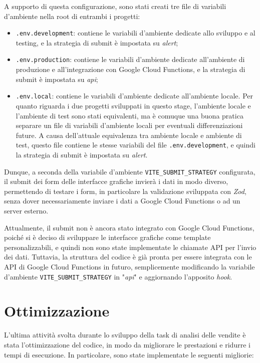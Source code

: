 A supporto di questa configurazione, sono stati creati tre file di variabili d'ambiente nella root di entrambi i progetti:
\begin{itemize}
    \item \texttt{.env.development}: contiene le variabili d'ambiente dedicate allo sviluppo e al testing, e la strategia di submit è impostata su \emph{alert};
    \item \texttt{.env.production}: contiene le variabili d'ambiente dedicate all'ambiente di produzione e all'integrazione con Google Cloud Functions, e la strategia di submit è impostata su \emph{api};
    \item \texttt{.env.local}: contiene le variabili d'ambiente dedicate all'ambiente locale. Per quanto riguarda i due progetti sviluppati in questo stage, l'ambiente locale e l'ambiente di test sono stati equivalenti, ma è comuque una buona pratica separare un file di variabili d'ambiente locali per eventuali differenziazioni future. A causa dell'attuale equivalenza tra ambiente locale e ambiente di test, questo file contiene le stesse variabili del file \texttt{.env.development}, e quindi la strategia di submit è impostata su \emph{alert}.
\end{itemize}

Dunque, a seconda della variabile d'ambiente \texttt{VITE\_SUBMIT\_STRATEGY} configurata, il submit dei form delle interfacce grafiche invierà i dati in modo diverso, permettendo di testare i form, in particolare la validazione sviluppata con \emph{Zod}, senza dover necessariamente inviare i dati a Google Cloud Functions o ad un server esterno.

Attualmente, il submit non è ancora stato integrato con Google Cloud Functions, poiché si è deciso di sviluppare le interfacce grafiche come template personalizzabili, e quindi non sono state implementate le chiamate API per l'invio dei dati. Tuttavia, la struttura del codice è già pronta per essere integrata con le API di Google Cloud Functions in futuro, semplicemente modificando la variabile d'ambiente \texttt{VITE\_SUBMIT\_STRATEGY} in "\emph{api}" e aggiornando l'apposito \emph{hook}.



\section{Ottimizzazione}

L'ultima attività svolta durante lo sviluppo della task di analisi delle vendite è stata l'ottimizzazione del codice, in modo da migliorare le prestazioni e ridurre i tempi di esecuzione. In particolare, sono state implementate le seguenti migliorie:

